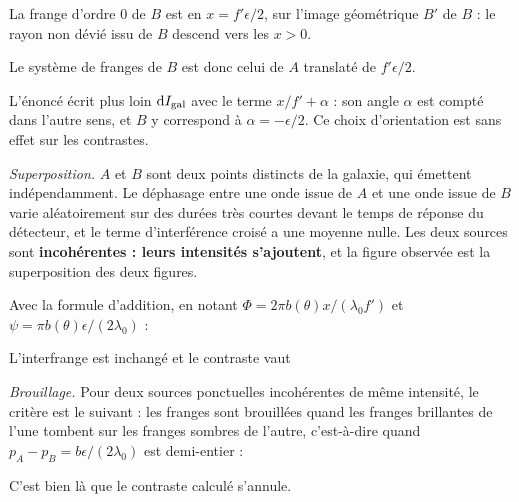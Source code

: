 \documentclass[11pt,a4paper]{article}
\newcommand{\equationajustee}[1]{%
  \sbox{\boiteequation}{$\displaystyle #1$}%
  \ifdim\wd\boiteequation>\linewidth
    \[\resizebox{\linewidth}{!}{\usebox{\boiteequation}}\]%
  \else
    \[#1\]%
  \fi}
\begin{document}
La frange d'ordre 0 de \(B\) est en \(x=f'\epsilon/2\), sur l'image géométrique \(B'\) de \(B\) : le rayon non dévié issu de \(B\) descend vers les \(x>0\).

Le système de franges de \(B\) est donc celui de \(A\) translaté de \(f'\epsilon/2\).

L'énoncé écrit plus loin \(\mathrm dI_{\rm gal}\) avec le terme \(x/f'+\alpha\) : son angle \(\alpha\) est compté dans l'autre sens, et \(B\) y correspond à \(\alpha=-\epsilon/2\). Ce choix d'orientation est sans effet sur les contrastes.

\emph{Superposition.} \(A\) et \(B\) sont deux points distincts de la galaxie, qui émettent indépendamment. Le déphasage entre une onde issue de \(A\) et une onde issue de \(B\) varie aléatoirement sur des durées très courtes devant le temps de réponse du détecteur, et le terme d'interférence croisé a une moyenne nulle. Les deux sources sont \textbf{incohérentes : leurs intensités s'ajoutent}, et la figure observée est la superposition des deux figures.

Avec la formule d'addition, en notant \(\Phi=2\pi b(\theta)x/(\lambda_0f')\) et \(\psi=\pi b(\theta)\epsilon/(2\lambda_0)\) :

\equationajustee{\begin{aligned}
I(x)&=I_A+I_B\\
&=2I_0\left[2+\cos\Phi+\cos(\Phi-2\psi)\right]\\
&=4I_0\left[1+\cos\psi\,\cos(\Phi-\psi)\right]
\end{aligned}}

L'interfrange est inchangé et le contraste vaut

\equationajustee{C=\left|\cos\left(\frac{\pi b(\theta)\epsilon}{2\lambda_0}\right)\right|}

\emph{Brouillage.} Pour deux sources ponctuelles incohérentes de même intensité, le critère est le suivant : les franges sont brouillées quand les franges brillantes de l'une tombent sur les franges sombres de l'autre, c'est-à-dire quand \(p_A-p_B=b\epsilon/(2\lambda_0)\) est demi-entier :

\equationajustee{\begin{aligned}
\frac{\pi b(\theta)\epsilon}{2\lambda_0}&=\frac{\pi}{2}+k\pi\\
\boxed{b(\theta)=(2k+1)\frac{\lambda_0}{\epsilon},\quad k\in\mathbb N}&
\end{aligned}}

C'est bien là que le contraste calculé s'annule.
\end{document}
